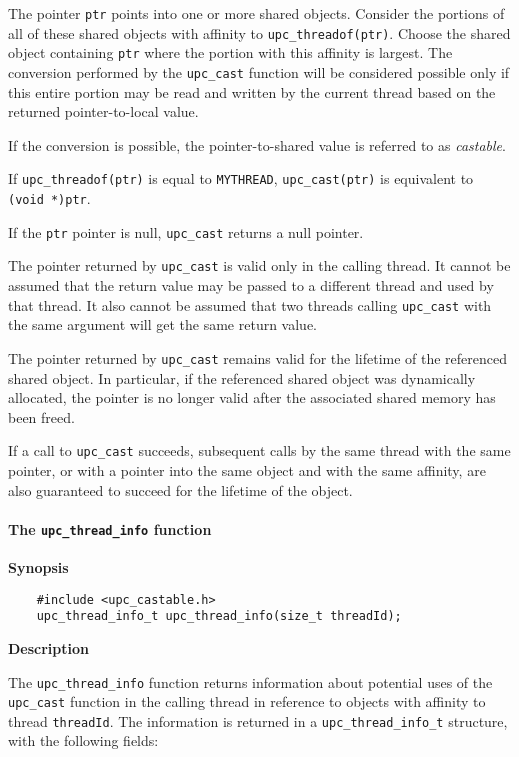 \np The pointer {\tt ptr} points into one or more shared objects.
Consider the portions of all of these shared objects with affinity to
{\tt upc\_threadof(ptr)}.  Choose the shared object
containing {\tt ptr} where the portion with this affinity is largest.
The conversion performed by the
{\tt upc\_cast} function will be considered possible only if this entire
portion may be read and written by the current thread based on the returned
pointer-to-local value.

\np If the conversion is possible, the pointer-to-shared value is referred to as
{\em castable}.

\np If {\tt upc\_threadof(ptr)} is equal to
{\tt MYTHREAD}, {\tt upc\_cast(ptr)} is equivalent to {\tt (void *)ptr}.

\np If the {\tt ptr} pointer is null, {\tt upc\_cast} returns a null pointer.

\np The pointer returned by {\tt upc\_cast} is valid only in the calling
thread.  It cannot be assumed that the return value may be passed to
a different thread and used by that thread.  It also cannot be assumed that two
threads calling {\tt upc\_cast} with the same argument will get the same
return value.

\np The pointer returned by {\tt upc\_cast} remains valid for the lifetime
of the referenced shared object.  In particular, if the referenced shared
object was dynamically allocated, the pointer is no longer valid after the 
associated shared memory has been freed.

\np If a call to {\tt upc\_cast} succeeds, subsequent calls by the same thread
with the same pointer, or with a pointer into the same object and with the same
affinity, are also guaranteed to succeed for the lifetime of the object.

\paragraph{The {\tt upc\_thread\_info} function}

{\bf Synopsis}

\npf\vspace{-2.5em}
\begin{verbatim}
    #include <upc_castable.h>
    upc_thread_info_t upc_thread_info(size_t threadId);
\end{verbatim}

{\bf Description}

\np The {\tt upc\_thread\_info} function returns information about
potential uses of the {\tt upc\_cast} function in the calling
thread in reference to objects with
affinity to thread {\tt threadId}.  The information is returned in a
{\tt upc\_thread\_info\_t} structure, with the following fields:

